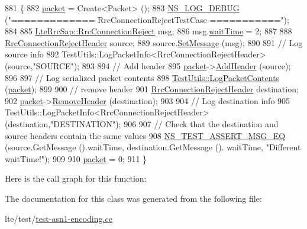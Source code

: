 \begin{DoxyCode}
881 \{
882   \hyperlink{classRrcHeaderTestCase_a6f0748c0e845f797497fbda1ca781803}{packet} = Create<Packet> ();
883   \hyperlink{group__logging_ga413f1886406d49f59a6a0a89b77b4d0a}{NS\_LOG\_DEBUG} (\textcolor{stringliteral}{"============= RrcConnectionRejectTestCase ==========="});
884 
885   \hyperlink{structns3_1_1LteRrcSap_1_1RrcConnectionReject}{LteRrcSap::RrcConnectionReject} msg;
886   msg.\hyperlink{structns3_1_1LteRrcSap_1_1RrcConnectionReject_a2a7999c9f68b395cf5dc44a35270a2b5}{waitTime} = 2;
887 
888   \hyperlink{classns3_1_1RrcConnectionRejectHeader}{RrcConnectionRejectHeader} source;
889   source.\hyperlink{classns3_1_1RrcConnectionRejectHeader_ad5759cc7590e355987535f7d44dbf73a}{SetMessage} (msg);
890 
891   \textcolor{comment}{// Log source info}
892   TestUtils::LogPacketInfo<RrcConnectionRejectHeader> (source,\textcolor{stringliteral}{"SOURCE"});
893 
894   \textcolor{comment}{// Add header}
895   \hyperlink{classRrcHeaderTestCase_a6f0748c0e845f797497fbda1ca781803}{packet}->\hyperlink{classns3_1_1Packet_a465108c595a0bc592095cbcab1832ed8}{AddHeader} (source);
896 
897   \textcolor{comment}{// Log serialized packet contents}
898   \hyperlink{classTestUtils_a9391dac3282094e6e57c0052d88a086f}{TestUtils::LogPacketContents} (\hyperlink{classRrcHeaderTestCase_a6f0748c0e845f797497fbda1ca781803}{packet});
899 
900   \textcolor{comment}{// remove header}
901   \hyperlink{classns3_1_1RrcConnectionRejectHeader}{RrcConnectionRejectHeader} destination;
902   \hyperlink{classRrcHeaderTestCase_a6f0748c0e845f797497fbda1ca781803}{packet}->\hyperlink{classns3_1_1Packet_a0961eccf975d75f902d40956c93ba63e}{RemoveHeader} (destination);
903 
904   \textcolor{comment}{// Log destination info}
905   TestUtils::LogPacketInfo<RrcConnectionRejectHeader> (destination,\textcolor{stringliteral}{"DESTINATION"});
906 
907   \textcolor{comment}{// Check that the destination and source headers contain the same values}
908   \hyperlink{group__testing_ga2a9d78cffb3db8e867c35fff0b698cf5}{NS\_TEST\_ASSERT\_MSG\_EQ} (source.GetMessage ().waitTime, destination.GetMessage ().
      waitTime, \textcolor{stringliteral}{"Different waitTime!"});
909 
910   \hyperlink{classRrcHeaderTestCase_a6f0748c0e845f797497fbda1ca781803}{packet} = 0;
911 \}
\end{DoxyCode}


Here is the call graph for this function\+:




The documentation for this class was generated from the following file\+:\begin{DoxyCompactItemize}
\item 
lte/test/\hyperlink{test-asn1-encoding_8cc}{test-\/asn1-\/encoding.\+cc}\end{DoxyCompactItemize}
